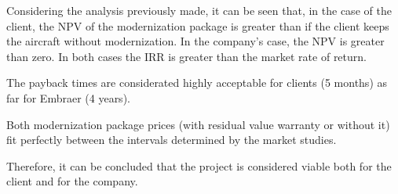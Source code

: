 Considering the analysis previously made, it can be seen that, in the case of the client, the NPV of the modernization package is greater than if the client keeps the aircraft without modernization. In the company's case, the NPV is greater than zero. In both cases the IRR is greater than the market rate of return.

The payback times are considerated highly acceptable for clients (5 months) as far for  Embraer (4 years).

Both modernization package prices (with residual value warranty or without it) fit perfectly between the intervals determined by the market studies.

Therefore, it can be concluded that the project is considered viable both for the client and for the company.
